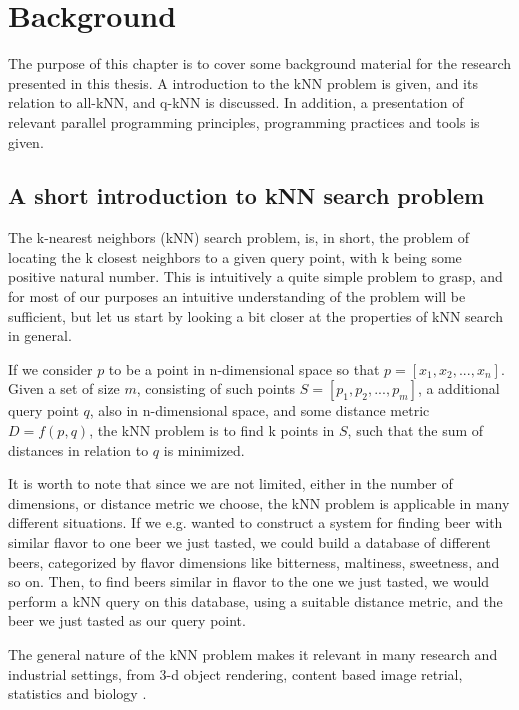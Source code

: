\chapter{Background}

The purpose of this chapter is to cover some background material for the research presented in this thesis. A introduction to the kNN problem is given, and its relation to all-kNN, and q-kNN is discussed. In addition, a presentation of relevant parallel programming principles, programming practices and tools is given.

\section{A short introduction to kNN search problem} %
\label{a_short_introduction_to_kNN_search_problem}

The k-nearest neighbors (kNN) search problem, is, in short, the problem of locating the k closest neighbors to a given query point, with k being some positive natural number. This is intuitively a quite simple problem to grasp, and for most of our purposes an intuitive understanding of the problem will be sufficient, but let us start by looking a bit closer at the properties of kNN search in general.

If we consider $p$ to be a point in n-dimensional space so that $p = [x_1, x_2,..., x_n]$. Given a set of size $m$, consisting of such points $S = [p_1, p_2,..., p_m]$, a additional query point $q$, also in n-dimensional space, and some distance metric $D = f(p, q)$, the kNN problem is to find k points in $S$, such that the sum of distances in relation to $q$ is minimized.

It is worth to note that since we are not limited, either in the number of dimensions, or distance metric we choose, the kNN problem is applicable in many different situations. If we e.g. wanted to construct a system for finding beer with similar flavor to one beer we just tasted, we could build a database of different beers, categorized by flavor dimensions like bitterness, maltiness, sweetness, and so on. Then, to find beers similar in flavor to the one we just tasted, we would perform a kNN query on this database, using a suitable distance metric, and the beer we just tasted as our query point.

The general nature of the kNN problem makes it relevant in many research and industrial settings, from 3-d object rendering, content based image retrial, statistics and biology \citep[Introduction]{Garcia2010}.

